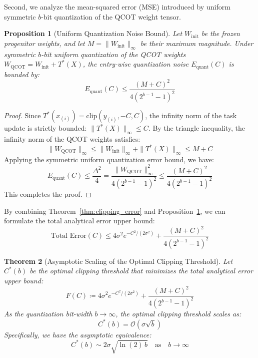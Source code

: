 \documentclass{article}
\theoremstyle{plain}
\newtheorem{theorem}{Theorem}[section]
\newtheorem{proposition}[theorem]{Proposition}
\theoremstyle{definition}
\theoremstyle{remark}
\begin{document}
Second, we analyze the mean-squared error (MSE) introduced by uniform symmetric $b$-bit quantization of the QCOT weight tensor.
\begin{proposition}[Uniform Quantization Noise Bound]
Let $W_{\text{init}}$ be the frozen progenitor weights, and let $M = \|W_{\text{init}}\|_{\infty}$ be their maximum magnitude. Under symmetric $b$-bit uniform quantization of the QCOT weights $W_{\text{QCOT}} = W_{\text{init}} + T^*(X)$, the entry-wise quantization noise $E_{\text{quant}}(C)$ is bounded by:
\begin{equation}
    E_{\text{quant}}(C) \le \frac{(M + C)^2}{4 (2^{b-1} - 1)^2}
\end{equation}
\label{prop:quant_noise}
\end{proposition}

\begin{proof}
Since $T^*(x_{(i)}) = \text{clip}(y_{(i)}, -C, C)$, the infinity norm of the task update is strictly bounded: $\|T^*(X)\|_{\infty} \le C$. By the triangle inequality, the infinity norm of the QCOT weights satisfies:
\begin{equation}
    \|W_{\text{QCOT}}\|_{\infty} \le \|W_{\text{init}}\|_{\infty} + \|T^*(X)\|_{\infty} \le M + C
\end{equation}
Applying the symmetric uniform quantization error bound, we have:
\begin{equation}
    E_{\text{quant}}(C) \le \frac{\Delta^2}{4} = \frac{\|W_{\text{QCOT}}\|_{\infty}^2}{4 (2^{b-1} - 1)^2} \le \frac{(M + C)^2}{4 (2^{b-1} - 1)^2}
\end{equation}
This completes the proof.
\end{proof}

By combining Theorem~\ref{thm:clipping_error} and Proposition~\ref{prop:quant_noise}, we can formulate the total analytical error upper bound:
\begin{equation}
    \text{Total Error}(C) \le 4\sigma^2 e^{-C^2 / (2\sigma^2)} + \frac{(M + C)^2}{4 (2^{b-1} - 1)^2}
\end{equation}

\begin{theorem}[Asymptotic Scaling of the Optimal Clipping Threshold]
Let $C^*(b)$ be the optimal clipping threshold that minimizes the total analytical error upper bound:
\begin{equation}
    F(C) \coloneqq 4\sigma^2 e^{-C^2 / (2\sigma^2)} + \frac{(M + C)^2}{4 (2^{b-1} - 1)^2}
\end{equation}
As the quantization bit-width $b \to \infty$, the optimal clipping threshold scales as:
\begin{equation}
    C^*(b) = \mathcal{O}(\sigma \sqrt{b})
\end{equation}
Specifically, we have the asymptotic equivalence:
\begin{equation}
    C^*(b) \sim 2\sigma \sqrt{\ln(2) \, b} \quad \text{as} \quad b \to \infty
\end{equation}
\label{thm:scaling}
\end{theorem}
\end{document}
